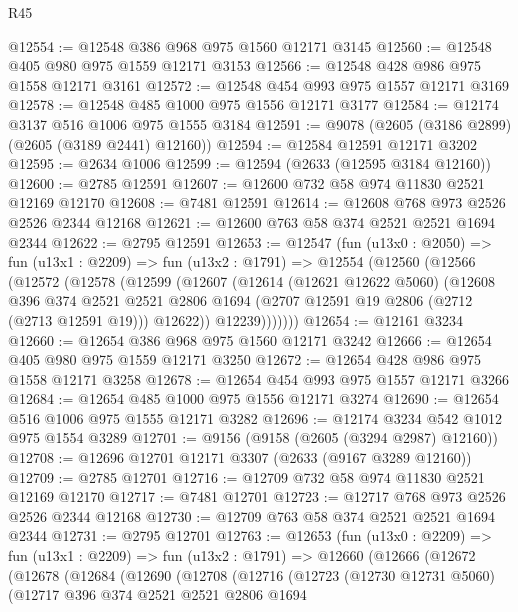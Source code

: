 \begin{lexlean}{R45}
\begin{coremodule}
@12554 := @12548 @386 @968 @975 @1560 @12171 @3145
@12560 := @12548 @405 @980 @975 @1559 @12171 @3153
@12566 := @12548 @428 @986 @975 @1558 @12171 @3161
@12572 := @12548 @454 @993 @975 @1557 @12171 @3169
@12578 := @12548 @485 @1000 @975 @1556 @12171 @3177
@12584 := @12174 @3137 @516 @1006 @975 @1555 @3184
@12591 := @9078 (@2605 (@3186 @2899) (@2605 (@3189 @2441) @12160))
@12594 := @12584 @12591 @12171 @3202
@12595 := @2634 @1006
@12599 := @12594 (@2633 (@12595 @3184 @12160))
@12600 := @2785 @12591
@12607 := @12600 @732 @58 @974 @11830 @2521 @12169 @12170
@12608 := @7481 @12591
@12614 := @12608 @768 @973 @2526 @2526 @2344 @12168
@12621 := @12600 @763 @58 @374 @2521 @2521 @1694 @2344
@12622 := @2795 @12591
@12653 := @12547
    (fun (u13x0 : @2050) =>
    fun (u13x1 : @2209) =>
    fun (u13x2 : @1791) =>
    @12554
      (@12560
        (@12566
          (@12572
            (@12578
              (@12599
                (@12607
                  (@12614
                    (@12621 @12622 @5060)
                    (@12608
                      @396
                      @374
                      @2521
                      @2521
                      @2806
                      @1694
                      (@2707 @12591 @19 @2806 (@2712 (@2713 @12591 @19)))
                      @12622))
                  @12239)))))))
@12654 := @12161 @3234
@12660 := @12654 @386 @968 @975 @1560 @12171 @3242
@12666 := @12654 @405 @980 @975 @1559 @12171 @3250
@12672 := @12654 @428 @986 @975 @1558 @12171 @3258
@12678 := @12654 @454 @993 @975 @1557 @12171 @3266
@12684 := @12654 @485 @1000 @975 @1556 @12171 @3274
@12690 := @12654 @516 @1006 @975 @1555 @12171 @3282
@12696 := @12174 @3234 @542 @1012 @975 @1554 @3289
@12701 := @9156 (@9158 (@2605 (@3294 @2987) @12160))
@12708 := @12696 @12701 @12171 @3307 (@2633 (@9167 @3289 @12160))
@12709 := @2785 @12701
@12716 := @12709 @732 @58 @974 @11830 @2521 @12169 @12170
@12717 := @7481 @12701
@12723 := @12717 @768 @973 @2526 @2526 @2344 @12168
@12730 := @12709 @763 @58 @374 @2521 @2521 @1694 @2344
@12731 := @2795 @12701
@12763 := @12653
    (fun (u13x0 : @2209) =>
    fun (u13x1 : @2209) =>
    fun (u13x2 : @1791) =>
    @12660
      (@12666
        (@12672
          (@12678
            (@12684
              (@12690
                (@12708
                  (@12716
                    (@12723
                      (@12730 @12731 @5060)
                      (@12717
                        @396
                        @374
                        @2521
                        @2521
                        @2806
                        @1694

\end{coremodule}
\end{lexlean}
